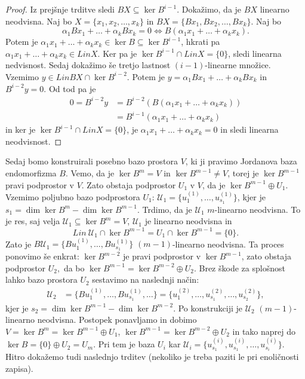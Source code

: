 \documentclass[10pt, a4paper]{article}
\newenvironment{noticeC}{%
  \tcolorbox[%
  notitle,
  empty,
  enhanced,  %
  breakable,
  coltext=black, 
  fontupper=\rmfamily,
  parbox=false,
  noparskip,
  sharp corners,
  boxrule=-1pt,  %
  frame hidden,
  left=7pt,  %
  right=7pt,
  top=5pt,
  bottom=5pt,
  before skip=2.5ex plus 2pt,
  after skip=2.5ex plus 2pt,
  overlay unbroken and last={%
  },
  ]}
{\endtcolorbox}
\newenvironment{dokaz}%
  {\begin{noticeC}\begin{proof}}%
  {\end{proof}\end{noticeC}}
\begin{document}
\begin{dokaz}
    Iz prejšnje trditve sledi $BX \subseteq \ker B^{i-1}$.
    Dokažimo, da je $BX$ linearno neodvisna. Naj bo $X = \{x_1, x_2, \dots, x_k\}$ in $BX = \{Bx_1, Bx_2, \dots, Bx_k\}$.
    Naj bo $$\alpha_1 Bx_1 + \dots + \alpha_k B x_k = 0 \Leftrightarrow B(\alpha_1 x_1 + \dots + \alpha_k x_k).$$
    Potem je $\alpha_1 x_1 + \dots + \alpha_k x_k \in \ker B \subseteq \ker B^{i-1}$, hkrati pa $\alpha_1 x_1 + \dots + \alpha_k x_k \in {Lin} X$.
    Ker pa je $\ker B^{i-1} \cap {Lin} X = \{0\}$, sledi linearna nedvisnost.
    Sedaj dokažimo še tretjo lastnost $(i-1)$-linearne množice.
    Vzemimo $y \in {Lin} BX \cap \ker B^{i-2}$.
    Potem je $y = \alpha_1 Bx_1 + \dots + \alpha_k B x_k$ in $B^{i-2} y = 0.$
    Od tod pa je \begin{align*}
        0 = B^{i-2} y &= B^{i-2} \left(B \left(\alpha_1 x_1 + \dots + \alpha_k x_k\right)\right)\\
        &= B^{i-1} \left(\alpha_1 x_1 + \dots + \alpha_k x_k\right)
    \end{align*}
    in ker je $\ker B^{i-1} \cap {Lin} X = \{0\}$, je $\alpha_1 x_1 + \dots + \alpha_k x_k = 0$ in sledi linearna neodvisnost.
\end{dokaz}

Sedaj bomo konstruirali posebno bazo prostora $V$, ki ji pravimo Jordanova baza endomorfizma $B$.
Vemo, da je $\ker B^m = V$ in $\ker B^{m-1} \neq V$, torej je $\ker B^{m-1}$ pravi podprostor v $V$.
Zato obstaja podprostor $U_1$ v $V$, da je $\ker B^{m-1} \oplus U_1$.
Vzemimo poljubno bazo podprostora $U_1$: $\mathcal{U}_1 = \{u_1 ^{(1)}, \dots, u_{s_1} ^{(1)}\}$,
kjer je $s_1 = \dim \ker B^{m} - \dim \ker B^{m-1}$.
Trdimo, da je $\mathcal{U}_1$ $m$-linearno neodvisna.
To je res, saj velja $\mathcal{U}_1 \subseteq \ker B^m = V$, $\mathcal{U}_1$ je linearno neodvisna in 
$${Lin\ \mathcal{U}_1} \cap \ker B^{m-1} = U_1 \cap \ker B^{m-1} = \{0\}.$$
Zato je $B\mathcal{U}_1 = \{B u_1 ^{(1)}, \dots, B u_{s_1} ^{(1)}\}$ $(m-1)$-linearno neodvisna.
Ta proces ponovimo še enkrat:
$\ker B^{m-2}$ je pravi podprostor v $\ker B^{m-1}$, zato obstaja podprostor $U_2,$ da bo 
$\ker B^{m-1} = \ker B^{m-2} \oplus U_2.$
Brez škode za splošnost lahko bazo prostora $U_2$ sestavimo na naslednji način:
\begin{align*}
    \mathcal{U}_2 &= \{B u_1 ^{(1)}, \dots, B u_{s_1} ^{(1)}, \dots\}
    = \{u_1 ^{(2)}, \dots, u_{s_1} ^{(2)}, \dots, u_{s_2} ^{(2)}\},
\end{align*}
kjer je $s_2 = \dim \ker B^{m-1} - \dim \ker B^{m-2}$. 
Po konstrukciji je $\mathcal{U}_2$ $(m-1)$-linearno neodvisna. 
Postopek ponavljamo in dobimo $V = \ker B^m = \ker B^{m-1} \oplus U_1$, $\ker B^{m-1} = \ker B^{m-2} \oplus U_2$ in tako naprej do $\ker B = \{0\} \oplus U_2 = U_m.$
Pri tem je baza $U_i$ kar $\mathcal{U}_i = \{u_{s_1} ^{(i)}, u_{s_1} ^{(i)}, \dots, u_{s_i} ^{(i)}\}$.
Hitro dokažemo tudi naslednjo trditev (nekoliko je treba paziti le pri enoličnosti zapisa).
\end{document}
